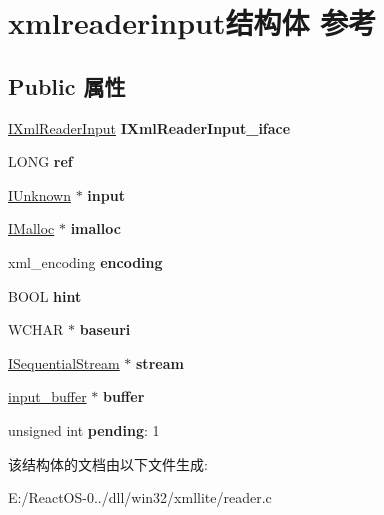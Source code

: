 \hypertarget{structxmlreaderinput}{}\section{xmlreaderinput结构体 参考}
\label{structxmlreaderinput}
\subsection*{Public 属性}
\begin{DoxyCompactItemize}
\item 
\mbox{\label{structxmlreaderinput_abc19d24c84c2d98cc8a36990ef851410}} 
\hyperlink{interface_i_unknown}{I\+Xml\+Reader\+Input} {\bfseries I\+Xml\+Reader\+Input\+\_\+iface}
\item 
\mbox{\label{structxmlreaderinput_a34112c44dd4c6abded31d1401952acf5}} 
L\+O\+NG {\bfseries ref}
\item 
\mbox{\label{structxmlreaderinput_a7eeaf9e340a2364ddd10c239a98cc650}} 
\hyperlink{interface_i_unknown}{I\+Unknown} $\ast$ {\bfseries input}
\item 
\mbox{\label{structxmlreaderinput_ae00fa919f27ef641ea64c08a27d5f6ed}} 
\hyperlink{interface_i_malloc}{I\+Malloc} $\ast$ {\bfseries imalloc}
\item 
\mbox{\label{structxmlreaderinput_aa5970ec1a8e2a57c02658361ead8d41b}} 
xml\+\_\+encoding {\bfseries encoding}
\item 
\mbox{\label{structxmlreaderinput_ab61707461f60f483ddfac8a961926dea}} 
B\+O\+OL {\bfseries hint}
\item 
\mbox{\label{structxmlreaderinput_a719d31d21f2cfdd2abe3624c9fc21d2d}} 
W\+C\+H\+AR $\ast$ {\bfseries baseuri}
\item 
\mbox{\label{structxmlreaderinput_a5387042a1cd040a3efbcf22d626f9517}} 
\hyperlink{interface_i_sequential_stream}{I\+Sequential\+Stream} $\ast$ {\bfseries stream}
\item 
\mbox{\label{structxmlreaderinput_a17f3466a678560fcfe0598a092bf7af1}} 
\hyperlink{structinput__buffer}{input\+\_\+buffer} $\ast$ {\bfseries buffer}
\item 
\mbox{\label{structxmlreaderinput_acb0b1eadbe4e645c0946b6fd08e3948c}} 
unsigned int {\bfseries pending}\+: 1
\end{DoxyCompactItemize}


该结构体的文档由以下文件生成\+:\begin{DoxyCompactItemize}
\item 
E\+:/\+React\+O\+S-\/0../dll/win32/xmllite/reader.\+c\end{DoxyCompactItemize}
